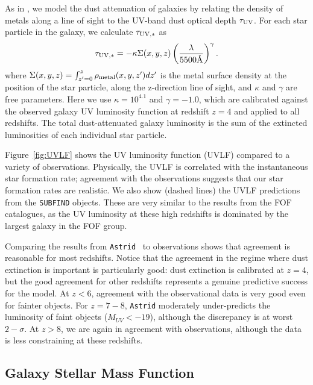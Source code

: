 \documentclass[fleqn,usenatbib]{mnras}
\def\astrid{\texttt{Astrid} }
\begin{document}
As in \citet{Wilkins2017}, we model the dust attenuation of galaxies by relating the density of metals along a line of sight to the UV-band dust optical depth $\tau_{\rm UV}$. For each star particle in the galaxy, we calculate $\tau_{\rm UV,\ast}$ as
\begin{equation}
\label{eq:dust_extinction}
 \tau_{{\rm UV,}\ast}= -\kappa \Sigma(x, y, z) \left(\frac{\lambda}{5500\text{\normalfont\AA}}\right)^{\gamma}.
\end{equation}
where $\Sigma(x, y, z) = \int_{z'=0}^{z} \rho_{\rm metal}(x,y,z')dz'$ is the metal surface density at the position of the star particle, along the z-direction line of sight, and $\kappa$ and $\gamma$ are free parameters. 
Here we use $\kappa=10^{4.1}$ and $\gamma=-1.0$, which are calibrated against the observed galaxy UV luminosity function at redshift $z=4$ and applied to all redshifts.
The total dust-attenuated galaxy luminosity is the sum of the extincted luminosities of each individual star particle.

Figure~\ref{fig:UVLF} shows the UV luminosity function (UVLF) compared to a variety of observations. Physically, the UVLF is correlated with the instantaneous star formation rate; agreement with the observations suggests that our star formation rates are realistic. We also show (dashed lines) the UVLF predictions from the \texttt{SUBFIND} objects. These are very similar to the results from the FOF catalogues, as the UV luminosity at these high redshifts is dominated by the largest galaxy in the FOF group. 

Comparing the results from \astrid~to observations shows that agreement is reasonable for most redshifts. Notice that the agreement in the regime where dust extinction is important is particularly good: dust extinction is calibrated at $z=4$, but the good agreement for other redshifts represents a genuine predictive success for the model. At $z < 6$, agreement with the observational data is very good even for fainter objects. For $z=7-8$, \astrid moderately under-predicts the luminosity of faint objects ($M_{UV} < -19$), although the discrepancy is at worst \citep[comparing to ][]{Bouwens2021} $2-\sigma$. At $z > 8$, we are again in agreement with observations, although the data is less constraining at these redshifts.

\subsection{Galaxy Stellar Mass Function}
\label{sec:gsmf}
\end{document}
